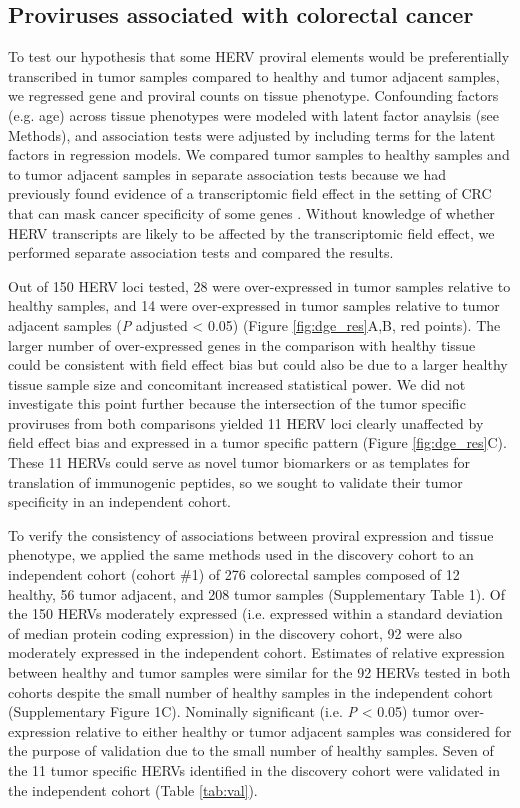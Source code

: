 \subsection*{Proviruses associated with colorectal cancer}
To test our hypothesis that some HERV proviral elements would be preferentially transcribed in tumor samples compared to healthy and tumor adjacent samples, we regressed gene and proviral counts on tissue phenotype.
Confounding factors (e.g. age) across tissue phenotypes were modeled with latent factor anaylsis (see Methods), and association tests were adjusted by including terms for the latent factors in regression models.
We compared tumor samples to healthy samples and to tumor adjacent samples in separate association tests because we had previously found evidence of a transcriptomic field effect in the setting of CRC that can mask cancer specificity of some genes \citep{Dampier2020}.
Without knowledge of whether HERV transcripts are likely to be affected by the transcriptomic field effect, we performed separate association tests and compared the results.

Out of 150 HERV loci tested, 28 were over-expressed in tumor samples relative to healthy samples, and 14 were over-expressed in tumor samples relative to tumor adjacent samples (\emph{P} adjusted < 0.05) (Figure \ref{fig:dge_res}A,B, red points).
The larger number of over-expressed genes in the comparison with healthy tissue could be consistent with field effect bias but could also be due to a larger healthy tissue sample size and concomitant increased statistical power.
We did not investigate this point further because the intersection of the tumor specific proviruses from both comparisons yielded 11 HERV loci clearly unaffected by field effect bias and expressed in a tumor specific pattern (Figure \ref{fig:dge_res}C).
These 11 HERVs could serve as novel tumor biomarkers or as templates for translation of immunogenic peptides, so we sought to validate their tumor specificity in an independent cohort.

To verify the consistency of associations between proviral expression and tissue phenotype, we applied the same methods used in the discovery cohort to an independent cohort (cohort \#1) of 276 colorectal samples composed of 12 healthy, 56 tumor adjacent, and 208 tumor samples (Supplementary Table 1).
Of the 150 HERVs moderately expressed (i.e. expressed within a standard deviation of median protein coding expression) in the discovery cohort, 92 were also moderately expressed in the independent cohort.
Estimates of relative expression between healthy and tumor samples were similar for the 92 HERVs tested in both cohorts despite the small number of healthy samples in the independent cohort (Supplementary Figure 1C).
Nominally significant (i.e. \emph{P} < 0.05) tumor over-expression relative to either healthy or tumor adjacent samples was considered for the purpose of validation due to the small number of healthy samples.
Seven of the 11 tumor specific HERVs identified in the discovery cohort were validated in the independent cohort (Table \ref{tab:val}).

